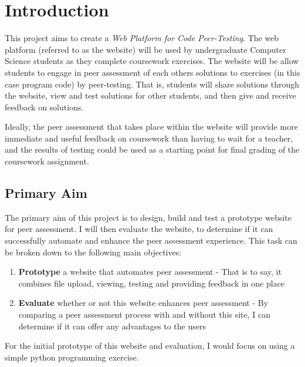 \documentclass[a4paper,11pt]{report}
\begin{document}
\newpage

\pagestyle{headings}


\section{Introduction}
This project aims to create a \textit{Web Platform for Code Peer-Testing}. The web platform (referred to as the website) will be used by undergraduate Computer Science students as they complete coursework exercises. The website will be allow students to engage in peer assessment of each others solutions to exercises (in this case program code) by peer-testing. That is, students will share solutions through the website, view and test solutions for other students, and then give and receive feedback on solutions.\par
Ideally, the peer assessment that takes place within the website will provide more immediate and useful feedback on coursework than having to wait for a teacher, and the results of testing could be used as a starting point for final grading of the coursework assignment.

\subsection{Primary Aim}
The primary aim of this project is to design, build and test a prototype website for peer assessment. I will then evaluate the website, to determine if it can successfully automate and enhance the peer assessment experience. This task can be broken down to the following main objectives:
\begin{enumerate}
\item \textbf{Prototype} a website that automates peer assessment - That is to say, it combines file upload, viewing, testing and providing feedback in one place
\item \textbf{Evaluate} whether or not this website enhances peer assessment - By comparing a peer assessment process with and without this site, I can determine if it can offer any advantages to the users
\end{enumerate}
For the initial prototype of this website and evaluation, I would focus on using a simple python programming exercise.
\end{document}
